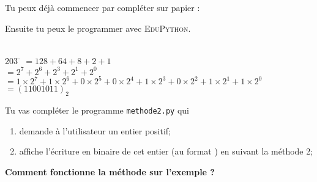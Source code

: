 \documentclass[a4paper,12pt,french]{book}
\begin{document}
Tu peux déjà commencer par compléter sur papier :
\newpage


Ensuite tu peux le programmer avec \textsc{EduPython}.\\

\exo{}\\
\begin{methode}
\begin{tabbing}
	203	\= 	$=128+64+8+2+1$	\\
	
		\>	$=2^7+2^6+2^3+2^1+2^0$	\\
		
		\>	$=1\times 2^7+1\times 2^6+0\times 2^5 + 0\times 2^4 +1\times 2^3+0\times 2^2 + 1\times 
		2^1+1\times 2^0$	\\
		
		\> $=(11001011)_2$
\end{tabbing}
\end{methode}

Tu vas compléter le programme \texttt{methode2.py} qui
\begin{enumerate}[--]
	\item 	demande à l'utilisateur un entier positif;
	\item 	affiche l'écriture en binaire de cet entier (au format ) en suivant la méthode 2;\\
\end{enumerate}

\textbf{Comment fonctionne la méthode sur l'exemple ?}\\
\end{document}
